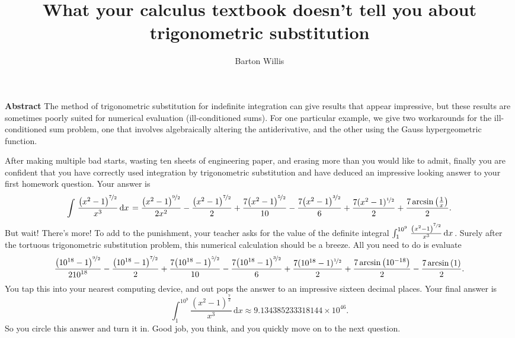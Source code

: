 \documentclass[12pt,fleqn]{article}
\title{What your calculus textbook doesn't tell you about trigonometric substitution}
\author{Barton Willis}
\begin{document}
\maketitle

\begin{shaded}
  \noindent \textbf{Abstract} The method of trigonometric substitution for indefinite
  integration can give results that appear impressive, but these results 
  are sometimes poorly suited for numerical evaluation (ill-conditioned sums).  
  For one particular example, we give two workarounds for the ill-conditioned sum problem, one that involves algebraically 
  altering the antiderivative, and the other using the Gauss hypergeometric function.
\end{shaded}

After making multiple bad starts, wasting ten sheets of engineering paper, 
 and erasing more  than you would like to admit, finally you are confident 
 that you have correctly used integration by trigonometric substitution and have
 deduced an impressive looking answer to your first homework question. Your answer
 is
 \begin{equation*}
    \int {\left. \frac{{{\left( {{x}^{2}}-1\right) }^{\nicefrac{7}{2}}}}{{{x}^{3}}} \, \mathrm{d}x\right.}=\frac{{{\left( {{x}^{2}}-1\right) }^{\nicefrac{9}{2}}}}{2 {{x}^{2}}}-\frac{{{\left( {{x}^{2}}-1\right) }^{\nicefrac{7}{2}}}}{2}+\frac{7 {{\left( {{x}^{2}}-1\right) }^{\nicefrac{5}{2}}}}{10}-\frac{7 {{\left( {{x}^{2}}-1\right) }^{\nicefrac{3}{2}}}}{6}+\frac{7 (x^2-1)^{\nicefrac{1}{2}}}{2}+\frac{7 \operatorname{arcsin}\left( \frac{1}{x}\right) }{2}.
\end{equation*}
But wait! There's more! To add to the punishment, your teacher asks for the value of  
the definite integral $\int_1^{10^9} {\left. \frac{{{\left( {{x}^{2}}-1\right) }^{\nicefrac{7}{2}}}}{{{x}^{3}}} \, \mathrm{d}x\right.}$. 
Surely after the tortuous trigonometric substitution problem, this numerical calculation
should be a breeze. All you need to do is evaluate
\begin{equation*}
  \frac{{{\left( {{10}^{18}}-1\right) }^{\nicefrac{9}{2}}}}{2 {{10}^{18}}}-\frac{{{\left( {{10}^{18}}-1\right) }^{\nicefrac{7}{2}}}}{2}+\frac{7 {{\left( {{10}^{18}}-1\right) }^{\nicefrac{5}{2}}}}{10}-\frac{7 {{\left( {{10}^{18}}-1\right) }^{\nicefrac{3}{2}}}}{6}+\frac{7 (10^{18}-1)^{\nicefrac{1}{2}}}{2}+\frac{7 \operatorname{arcsin}\left( 10^{-18}\right) }{2}
    - \frac{7 \operatorname{arcsin}\left( 1 \right) }{2}.
\end{equation*}
You tap this into your nearest computing device, and out  pops the answer to an 
impressive sixteen decimal places. Your final answer is
\begin{equation*}
    \int_1^{10^9} {\left. \frac{{{\left( {{x}^{2}}-1\right) }^{\frac{7}{2}}}}{{{x}^{3}}} \, \mathrm{d}x\right.}
       \approx 9.134385233318144 \times {{10}^{46}}.
\end{equation*}
So you circle this answer and turn it in. Good job, you think, and you
quickly move on to the next question.
\end{document}
